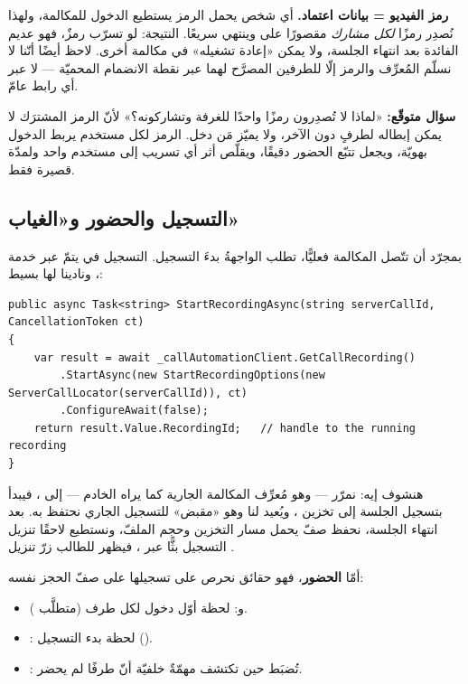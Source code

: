 \begin{secnote}
\textbf{رمز الفيديو = بيانات اعتماد.} أي شخص يحمل الرمز يستطيع الدخول للمكالمة، ولهذا
نُصدِر رمزًا \emph{لكل مشارك} مقصورًا على  وينتهي سريعًا. النتيجة: لو تسرّب
رمزٌ، فهو عديم الفائدة بعد انتهاء الجلسة، ولا يمكن «إعادة تشغيله» في مكالمة أخرى.
لاحظ أيضًا أنّنا لا نسلّم المُعرِّف والرمز إلّا للطرفين المصرَّح لهما عبر نقطة
الانضمام المحميّة — لا عبر أي رابط عامّ.
\end{secnote}

\begin{qa}
\textbf{سؤال متوقّع:} «لماذا لا تُصدِرون رمزًا واحدًا للغرفة وتشاركونه؟» لأنّ الرمز
المشترَك لا يمكن إبطاله لطرفٍ دون الآخر، ولا يميّز مَن دخل. الرمز لكل مستخدم يربط
الدخول بهويّة، ويجعل تتبّع الحضور دقيقًا، ويقلّص أثر أي تسريب إلى مستخدم واحد ولمدّة
قصيرة فقط.
\end{qa}

\subsection{التسجيل والحضور و«الغياب»}

بمجرّد أن تتّصل المكالمة فعليًّا، تطلب الواجهةُ بدءَ التسجيل. التسجيل في 
يتمّ عبر خدمة ، ونادينا لها بسيط:

\begin{english}
\begin{lstlisting}[language={[Sharp]C}]
public async Task<string> StartRecordingAsync(string serverCallId, CancellationToken ct)
{
    var result = await _callAutomationClient.GetCallRecording()
        .StartAsync(new StartRecordingOptions(new ServerCallLocator(serverCallId)), ct)
        .ConfigureAwait(false);
    return result.Value.RecordingId;   // handle to the running recording
}
\end{lstlisting}
\end{english}

هنشوف إيه: نمرّر  — وهو مُعرِّف المكالمة الجارية كما يراه الخادم —
إلى ، فيبدأ  بتسجيل الجلسة إلى تخزين ، ويُعيد لنا
 وهو «مقبض» للتسجيل الجاري نحتفظ به. بعد انتهاء الجلسة، نحفظ صفّ
 يحمل مسار التخزين وحجم الملفّ، ونستطيع لاحقًا تنزيل التسجيل
بثًّا عبر ، فيظهر للطالب زرّ تنزيل .

أمّا \textbf{الحضور}، فهو حقائق نحرص على تسجيلها على صفّ الحجز نفسه:
\begin{itemize}
\item {} و: لحظة أوّل دخول لكل طرف
  (متطلَّب ).
\item {}: لحظة بدء التسجيل ().
\item {}: تُضبَط حين تكتشف مهمّةٌ خلفيّة أنّ طرفًا لم يحضر.
\end{itemize}

